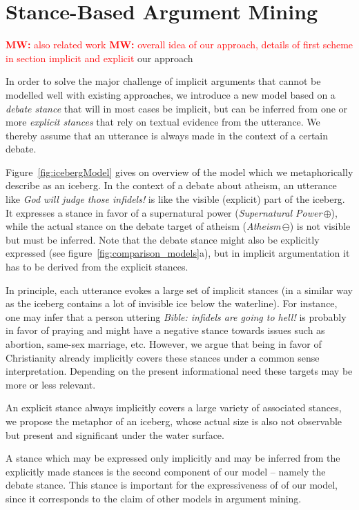 \documentclass[11pt]{article}
\newcommand{\mw}[1]{\textcolor{red}{\textbf{MW:} #1}}
\newcommand{\mw}[1]{}
\begin{document}
\section{Stance-Based Argument Mining}
\mw{also related work}
\mw{overall idea of our approach, details of first scheme in section implicit and explicit }
our approach

In order to solve the major challenge of implicit arguments that cannot be modelled well with existing approaches, we introduce a new model based on a \textit{debate stance} that will in most cases be implicit, but can be inferred from one or more \textit{explicit stances} that rely on textual evidence from the utterance.
We thereby assume that an utterance is always made in the context of a certain debate.

Figure~\ref{fig:icebergModel} gives on overview of the model which we metaphorically describe as an iceberg.
In the context of a debate about atheism, an utterance like \textit{God will judge those infidels!} is like the visible (explicit) part of the iceberg.
It expresses a stance in favor of a supernatural power (\textit{Supernatural Power}\,$\oplus$), while the actual stance on the debate target of atheism (\textit{Atheism}\,$\ominus$) is not visible but must be inferred.
Note that the debate stance might also be explicitly expressed (see figure~\ref{fig:comparison_models}a), but in implicit argumentation it has to be derived from the explicit stances.

In principle, each utterance evokes a large set of implicit stances (in a similar way as the iceberg contains a lot of invisible ice below the waterline). 
For instance, one may infer that a person uttering \textit{Bible: infidels are going to hell!} is probably in favor of praying and might have a negative stance towards issues such as abortion, same-sex marriage, etc. 
However, we argue that being in favor of Christianity already implicitly covers these stances under a common sense interpretation. 
Depending on the present informational need these targets may be more or less relevant.

An explicit stance always implicitly covers a large variety of associated stances, we propose the metaphor of an iceberg, whose actual size is also not observable but present and significant under the water surface. 

A stance which may be expressed only implicitly and may be inferred from the explicitly made stances is the second component of our model -- namely the debate stance.
This stance is important for the expressiveness of of our model, since it corresponds to the claim of other models in argument mining.
\end{document}
